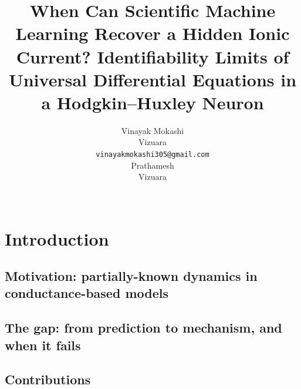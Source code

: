 \documentclass{article}
\title{When Can Scientific Machine Learning Recover a Hidden Ionic Current?
Identifiability Limits of Universal Differential Equations in a
Hodgkin--Huxley Neuron}
\author{
  Vinayak Mokashi \\
  Vizuara \\ %
  \texttt{vinayakmokashi305@gmail.com} \\
  \And
  Prathamesh \\ %
  Vizuara \\
  \texttt{} \\
}
\begin{document}
\maketitle

\begin{abstract}
\end{abstract}


\section{Introduction}
\label{sec:intro}

\subsection{Motivation: partially-known dynamics in conductance-based models}

\subsection{The gap: from prediction to mechanism, and when it fails}

\subsection{Contributions}
\end{document}
